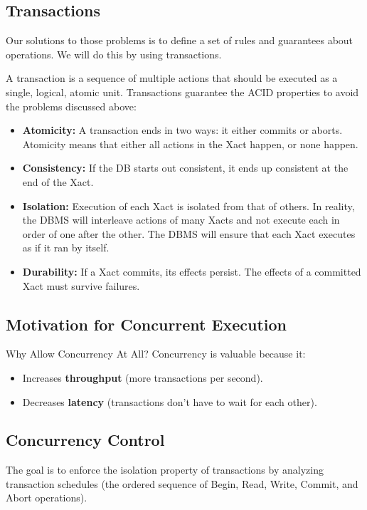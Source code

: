 \documentclass{article}
\begin{document}
\subsection{Transactions}
Our solutions to those problems is to define a set of rules and guarantees about operations. We will do this by using transactions.

A transaction is a sequence of multiple actions that should be executed as a single, logical, atomic unit. Transactions guarantee the ACID properties to avoid the problems discussed above:
\begin{itemize}
    \item \textbf{Atomicity:} A transaction ends in two ways: it either commits or aborts. Atomicity means that either all actions in the Xact happen, or none happen.
    
    \item \textbf{Consistency:} If the DB starts out consistent, it ends up consistent at the end of the Xact.
    
    \item \textbf{Isolation:} Execution of each Xact is isolated from that of others. In reality, the DBMS will interleave actions of many Xacts and not execute each in order of one after the other. The DBMS will ensure that each Xact executes as if it ran by itself.
    
    \item \textbf{Durability:} If a Xact commits, its effects persist. The effects of a committed Xact must survive failures.
\end{itemize}

\subsection{Motivation for Concurrent Execution}

Why Allow Concurrency At All? Concurrency is valuable because it:
\begin{itemize}
    \item Increases \textbf{throughput} (more transactions per second).
    
    \item Decreases \textbf{latency} (transactions don't have to wait for each other).
\end{itemize}

\subsection{Concurrency Control}
The goal is to enforce the isolation property of transactions by analyzing transaction schedules (the ordered sequence of Begin, Read, Write, Commit, and Abort operations).
\end{document}
